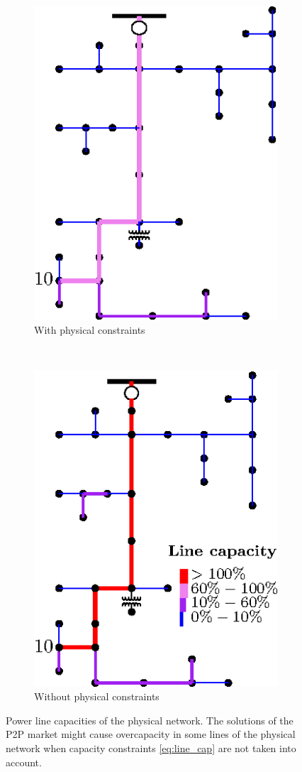 \documentclass{IEEEtran}  %
\newcommand{\0}{\mathbf{0}}
\newcommand{\1}{\mathbf{1}}
\begin{document}
\begin{figure}[t]
	\centering
	\begin{subfigure}[t]{0.23\textwidth}
		\centering
		\includegraphics[scale=0.9]{figures/simD_safe1}
		\caption{With physical constraints}
	\end{subfigure}%
	~ 
	\begin{subfigure}[t]{0.27\textwidth}
		\centering
		\includegraphics[scale=0.9]{figures/simD_fail2}
		\caption{Without physical constraints}
	\end{subfigure}
	\caption{Power line capacities of the physical network. The solutions of the P2P market might cause overcapacity in some lines of the physical network when capacity constraints \eqref{eq:line_cap} are not taken into account.}
	\label{fig:simD_safe}
\end{figure}
\end{document}
